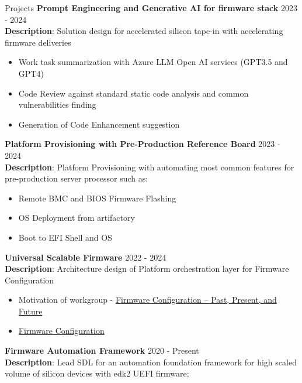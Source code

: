 \documentclass{resume} %
\begin{document}
\begin{rSection}{Projects}
{\bf Prompt Engineering and Generative AI for firmware stack} \hfill {2023 - 2024}\\
\textbf{Description}: Solution design for accelerated silicon tape-in with accelerating firmware deliveries

\begin{itemize}
    \item Work task summarization with Azure LLM Open AI services (GPT3.5 and GPT4)
    \item Code Review against standard static code analysis and common vulnerabilities finding
    \item Generation of Code Enhancement suggestion 
\end{itemize}

\textbf{Platform Provisioning with Pre-Production Reference Board} \hfill {2023 - 2024}\\
\textbf{Description}: Platform Provisioning with automating most common features for pre-production server processor such as:

\begin{itemize}
    \item Remote BMC and BIOS Firmware Flashing
    \item OS Deployment from artifactory
    \item Boot to EFI Shell and OS
\end{itemize}

\textbf{Universal Scalable Firmware} \hfill {2022 - 2024} \\
\textbf{Description}: Architecture design of Platform orchestration layer for Firmware Configuration

\begin{itemize}
    \item Motivation of workgroup - \href{https://uefi.org/sites/default/files/resources/Firmware%20Configuration%20%E2%80%93%20Past%2C%20Present%2C%20and%20Future_Zimmer.pdf}{Firmware Configuration – Past, Present, and Future}
    \item \href{https://universalscalablefirmware.github.io/documentation/7_yaml_boot_configuration.html}{Firmware Configuration}
\end{itemize}

\textbf{Firmware Automation Framework}  \hfill {2020 - Present} \\
\textbf{Description}: Lead SDL for an automation foundation framework for high scaled volume of silicon devices with edk2 UEFI firmware;


\end{rSection}
\end{document}
